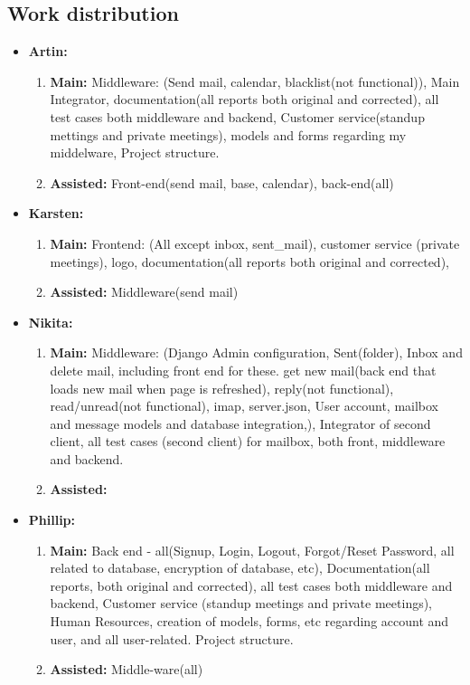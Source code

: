 \documentclass{article}
\begin{document}
\subsection*{Work distribution}
\begin{itemize}
    \item \textbf{Artin:}
    \begin{enumerate}
        \item \textbf{Main:} Middleware: (Send mail, calendar, blacklist(not functional)), Main Integrator, documentation(all reports both original and corrected), all test cases both middleware and backend, Customer service(standup mettings and private meetings), models and forms regarding my middelware, Project structure.
        \item \textbf{Assisted:} Front-end(send mail, base, calendar), back-end(all)
    \end{enumerate}
    \item \textbf{Karsten:}
    \begin{enumerate}
        \item \textbf{Main:} Frontend: (All except inbox, sent\_mail), customer service (private meetings), logo, documentation(all reports both original and corrected), 
        \item \textbf{Assisted:} Middleware(send mail)
    \end{enumerate}
    \item \textbf{Nikita:}
    \begin{enumerate}
        \item \textbf{Main:} Middleware: (Django Admin configuration, Sent(folder), Inbox and delete mail, including front end for these. get new mail(back end that loads new mail when page is refreshed),
        reply(not functional), read/unread(not functional), imap, server.json, User account, mailbox and message models and database integration,), Integrator of second client, all test cases (second client) for mailbox, both front, middleware and backend.
        \item \textbf{Assisted:} 
    \end{enumerate}
    \item \textbf{Phillip:}
    \begin{enumerate}
        \item \textbf{Main:} Back end - all(Signup, Login, Logout, Forgot/Reset Password, all related to database, encryption of database, etc), Documentation(all reports, both original and corrected), all test cases both middleware and backend, Customer service (standup meetings and private meetings), Human Resources, creation of models, forms, etc regarding account and user, and all user-related. Project structure.
        \item \textbf{Assisted:} Middle-ware(all)
    \end{enumerate}
\end{itemize}

\printindex[Alphabetical]
\printindex[Functions]
\end{document}
